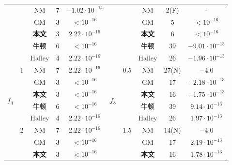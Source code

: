 \begin{center}
\begin{longtable}[!htbp]{c|c|ccc|c|c|ccc}
    & 	   & 	NM  & 	7  & 	$-1.02 \cdot 10^{-14}$&	   & 	   & 	NM  & 	2(F)  & 	$\text{-}$\\

    & 	   & 	GM  & 	3  & 	$< 10^{-16}$&	   & 	   & 	GM  & 	5  & 	$< 10^{-16}$\\

    & 	   & 	\textbf{本文}  & 	3  & 	$2.22 \cdot 10^{-16}$&	   & 	   & 	\textbf{本文}  & 	6  & 	$< 10^{-16}$\\

\cline{2-5}\cline{7-10}
\hline




    \multirow{10}{*}{$f_4$} & 	\multirow{5}{*}{1}  & 	牛顿  & 	6  & 	$< 10^{-16}$&	\multirow{10}{*}{$f_8$}    & 	\multirow{5}{*}{0.5}  & 	牛顿  & 	39  & 	$-9.01 \cdot 10^{-13}$\\

    & 	   & 	Halley  & 	4  & 	$2.22 \cdot 10^{-16}$&	   & 	   & 	Halley  & 	26  & 	$-1.96 \cdot 10^{-13}$\\

    & 	   & 	NM  & 	7  & 	$2.22 \cdot 10^{-16}$&	   & 	   & 	NM  & 	27(N)  & 	$-4.0$\\

    & 	   & 	GM  & 	3  & 	$< 10^{-16}$&	   & 	   & 	GM  & 	17  & 	$-2.18 \cdot 10^{-13}$\\

    & 	   & 	\textbf{本文}  & 	3  & 	$< 10^{-16}$&	   & 	   & 	\textbf{本文}  & 	16  & 	$-1.75 \cdot 10^{-13}$\\

\cline{2-5}\cline{7-10}
    & 	\multirow{5}{*}{2}  & 	牛顿  & 	6  & 	$< 10^{-16}$&	   & 	\multirow{5}{*}{1.5}  & 	牛顿  & 	39  & 	$9.14 \cdot 10^{-13}$\\

    & 	   & 	Halley  & 	4  & 	$2.22 \cdot 10^{-16}$&	   & 	   & 	Halley  & 	26  & 	$1.97 \cdot 10^{-13}$\\

    & 	   & 	NM  & 	7  & 	$2.22 \cdot 10^{-16}$&	   & 	   & 	NM  & 	14(N)  & 	$-4.0$\\

    & 	   & 	GM  & 	3  & 	$< 10^{-16}$&	   & 	   & 	GM  & 	17  & 	$2.19 \cdot 10^{-13}$\\

    & 	   & 	\textbf{本文}  & 	3  & 	$< 10^{-16}$&	   & 	   & 	\textbf{本文}  & 	16  & 	$1.78 \cdot 10^{-13}$\\

    \end{longtable}
\end{center}



